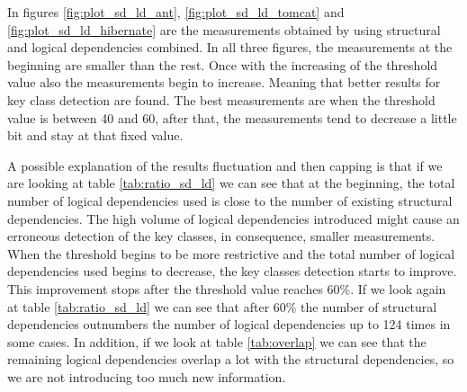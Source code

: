 \documentclass[12pt, a4paper, twoside]{report}
\begin{document}
\begin{table}[!h]
\renewcommand{\arraystretch}{1}
\caption{Ratio between structural and logical dependencies (SD/LD)}
\label{tab:ratio_sd_ld}
\centering
{}
\end{table}

In figures \ref{fig:plot_sd_ld_ant}, \ref{fig:plot_sd_ld_tomcat} and \ref{fig:plot_sd_ld_hibernate} are the measurements obtained by using structural and logical dependencies combined. 
In all three figures, the measurements at the beginning are smaller than the rest. Once with the increasing of the threshold value also the measurements begin to increase. Meaning that better results for key class detection are found. 
The best measurements are when the threshold value is between 40 and 60, after that, the measurements tend to decrease a little bit and stay at that fixed value. 

A possible explanation of the results fluctuation and then capping is that if we are looking at table \ref{tab:ratio_sd_ld} we can see that at the beginning, the total number of logical dependencies used is close to the number of existing structural dependencies. The high volume of logical dependencies introduced might cause an erroneous detection of the key classes, in consequence, smaller measurements. 
When the threshold begins to be more restrictive and the total number of logical dependencies used begins to decrease, the key classes detection starts to improve. This improvement stops after the threshold value reaches 60\%. If we look again at table \ref{tab:ratio_sd_ld} we can see that after 60\% the number of structural dependencies outnumbers the number of logical dependencies up to 124 times in some cases. In addition, if we look at table \ref{tab:overlap} we can see that the remaining logical dependencies overlap a lot with the structural dependencies, so we are not introducing too much new information.
\end{document}
